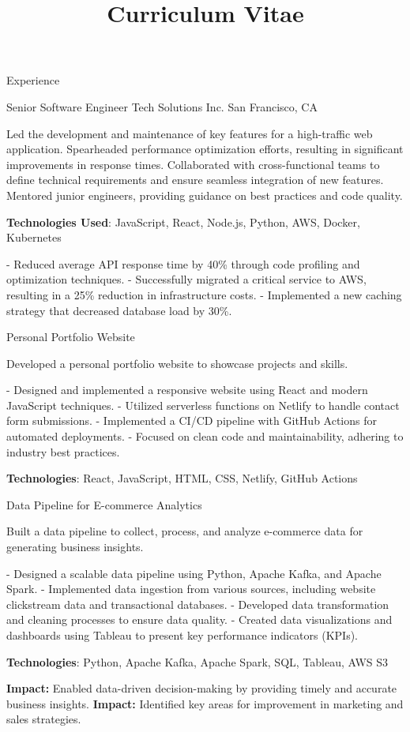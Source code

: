 \documentclass[a4paper,11pt,english]{curve}
\title{Curriculum Vitae}
\begin{document}
\makeheaders[c]

\begin{rubric}{Experience}
\begin{eventlist}
{Senior Software Engineer}
{Tech Solutions Inc.}
{San Francisco, CA}
{Led the development and maintenance of key features for a high-traffic web application. Spearheaded performance optimization efforts, resulting in significant improvements in response times. Collaborated with cross-functional teams to define technical requirements and ensure seamless integration of new features. Mentored junior engineers, providing guidance on best practices and code quality.

\textbf{Technologies Used}: JavaScript, React, Node.js, Python, AWS, Docker, Kubernetes

- Reduced average API response time by 40\% through code profiling and optimization techniques.
- Successfully migrated a critical service to AWS, resulting in a 25\% reduction in infrastructure costs.
- Implemented a new caching strategy that decreased database load by 30\%.}
\event{}
{Personal Portfolio Website}
{}
{}
{Developed a personal portfolio website to showcase projects and skills.

- Designed and implemented a responsive website using React and modern JavaScript techniques.
- Utilized serverless functions on Netlify to handle contact form submissions.
- Implemented a CI/CD pipeline with GitHub Actions for automated deployments.
- Focused on clean code and maintainability, adhering to industry best practices.

\textbf{Technologies}: React, JavaScript, HTML, CSS, Netlify, GitHub Actions}
\event{}
{Data Pipeline for E-commerce Analytics}
{}
{}
{Built a data pipeline to collect, process, and analyze e-commerce data for generating business insights.

- Designed a scalable data pipeline using Python, Apache Kafka, and Apache Spark.
- Implemented data ingestion from various sources, including website clickstream data and transactional databases.
- Developed data transformation and cleaning processes to ensure data quality.
- Created data visualizations and dashboards using Tableau to present key performance indicators (KPIs).

\textbf{Technologies}: Python, Apache Kafka, Apache Spark, SQL, Tableau, AWS S3

\textbf{Impact:} Enabled data-driven decision-making by providing timely and accurate business insights.
\textbf{Impact:} Identified key areas for improvement in marketing and sales strategies.}
\end{eventlist}
\end{rubric}
\end{document}
